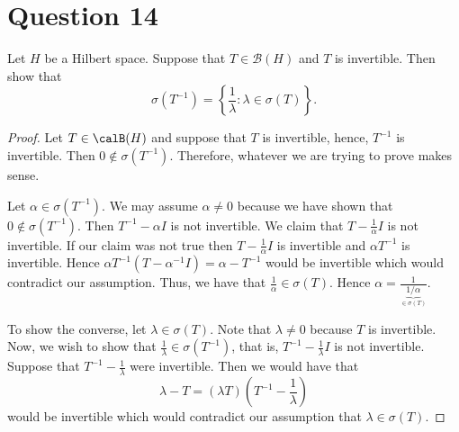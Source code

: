 \section{Question 14}

\horz

Let $H$ be a Hilbert space. Suppose that $T\in \mathcal B(H)$ and $T$ is invertible. Then show that $$\sigma(T^{-1})=\left \{ \frac{1}{\lambda} : \lambda \in \sigma (T)\right \}.$$

\horz


\begin{proof}
    Let $T \in \calB (H)$ and suppose that $T$ is invertible, hence, $T^{-1}$ is invertible. Then $0 \not \in \sigma (T^{-1})$. Therefore, whatever we are trying to prove makes sense.

    Let $\alpha \in \sigma (T^{-1})$. We may assume $\alpha \ne  0$ because we have shown that $0 \not \in \sigma \left( T^{-1} \right)$. Then $T^{-1}-\alpha I$ is not invertible. We claim that $T-\frac{1}{\alpha} I$ is not invertible. If our claim was not true then $T- \frac{1}{\alpha}I$ is invertible and $\alpha T^{-1}$ is invertible. Hence $\alpha T^{-1}(T- \alpha^{-1} I) = \alpha - T^{-1}$ would be invertible which would contradict our assumption. Thus, we have that $\frac{1}{\alpha} \in \sigma (T)$. Hence $\alpha = \frac{1}{\underbrace{1/\alpha}_{\in \sigma (T)}}$.

    To show the converse, let $\lambda \in \sigma (T)$. Note that $\lambda \ne 0$ because $T$ is invertible. Now, we wish to show that $\frac{1}{\lambda} \in \sigma (T^{-1})$, that is, $T^{-1} - \frac{1}{\lambda} I$ is not invertible. Suppose that $T^{-1}- \frac{1}{\lambda}$ were invertible. Then we would have that 
    \begin{equation*}
	\lambda - T=(\lambda T) \left( T^{-1} - \frac{1}{\lambda} \right)
    \end{equation*}
    would be invertible which would contradict our assumption that $\lambda \in \sigma (T)$.
\end{proof}
